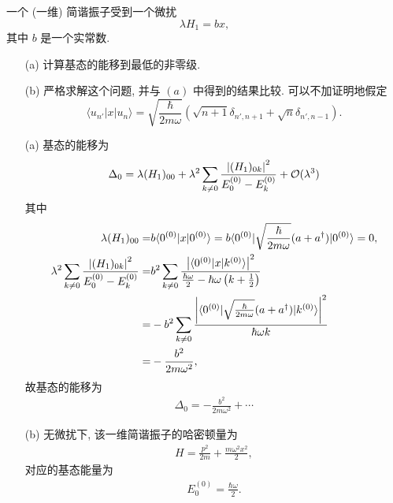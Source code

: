 \documentclass{assignment}
\begin{document}
\begin{prob}[课本习题 5.1]
    一个 (一维) 简谐振子受到一个微扰
    \[
        \lambda H_1=bx,
    \]
    其中 $b$ 是一个实常数.
    \begin{itemize}
        \item[(a)] 计算基态的能移到最低的非零级.
        \item[(b)] 严格求解这个问题, 并与 $(a)$ 中得到的结果比较. 可以不加证明地假定
        \[
            \langle u_{n'}\rvert x\lvert u_n\rangle=\sqrt{\frac{\hbar}{2m\omega}}(\sqrt{n+1}\delta_{n',n+1}+\sqrt{n}\delta_{n',n-1}).
        \]
    \end{itemize}
\end{prob}
\begin{sol}
    \begin{itemize}
        \item[(a)] 基态的能移为
        \begin{align}
            \Delta_0=\lambda(H_1)_{00}+\lambda^2\sum_{k\neq 0}\frac{\left\lvert(H_1)_{0k}\right\rvert^2}{E_0^{(0)}-E_k^{(0)}}+\mathcal{O}(\lambda^3)
        \end{align}
        其中
        \begin{align}
            \lambda(H_1)_{00}=&b\langle 0^{(0)}\rvert x\lvert 0^{(0)}\rangle=b\langle 0^{(0)}\rvert\sqrt{\frac{\hbar}{2m\omega}}(a+a^{\dagger})\lvert 0^{(0)}\rangle=0,\\
            \notag\lambda^2\sum_{k\neq 0}\frac{\left\lvert(H_1)_{0k}\right\rvert^2}{E_0^{(0)}-E_k^{(0)}}=&b^2\sum_{k\neq 0}\frac{\left\lvert\langle 0^{(0)}\rvert x\lvert k^{(0)}\rangle\right\rvert^2}{\frac{\hbar\omega}{2}-\hbar\omega\left(k+\frac{1}{2}\right)}\\
            \notag=&-b^2\sum_{k\neq 0}\frac{\left\lvert\langle 0^{(0)}\rvert\sqrt{\frac{\hbar}{2m\omega}}(a+a^{\dagger})\lvert k^{(0)}\rangle\right\rvert^2}{\hbar\omega k}\\
            \notag=&-\frac{b^2}{2m\omega^2},
        \end{align}
        故基态的能移为
        \begin{align}
            \Delta_0=-\frac{b^2}{2m\omega^2}+\cdots
        \end{align}
        \item[(b)] 无微扰下, 该一维简谐振子的哈密顿量为
        \begin{align}
            H=\frac{p^2}{2m}+\frac{m\omega^2x^2}{2},
        \end{align}
        对应的基态能量为
        \begin{align}
            E_0^{(0)}=\frac{\hbar\omega}{2}.

\end{align}
\end{itemize}
\end{sol}
\end{document}
